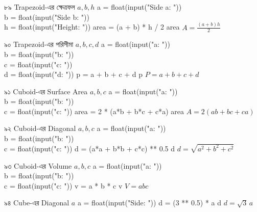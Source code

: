 
\formulaexercise
{৮৯}
{Trapezoid-এর ক্ষেত্রফল}
{\(a,b,h\)}
{a = float(input("Side a: "))\\
b = float(input("Side b: "))\\
h = float(input("Height: "))}
{area = (a + b) * h / 2}
{area}
{\(A=\frac{(a+b)h}{2}\)}


\formulaexercise
{৯০}
{Trapezoid-এর পরিসীমা}
{\(a,b,c,d\)}
{a = float(input("a: "))\\
b = float(input("b: "))\\
c = float(input("c: "))\\
d = float(input("d: "))}
{p = a + b + c + d}
{p}
{\(P=a+b+c+d\)}


\formulaexercise
{৯১}
{Cuboid-এর Surface Area}
{\(a,b,c\)}
{a = float(input("a: "))\\
b = float(input("b: "))\\
c = float(input("c: "))}
{area = 2 * (a*b + b*c + c*a)}
{area}
{\(A=2(ab+bc+ca)\)}


\formulaexercise
{৯২}
{Cuboid-এর Diagonal}
{\(a,b,c\)}
{a = float(input("a: "))\\
b = float(input("b: "))\\
c = float(input("c: "))}
{d = (a*a + b*b + c*c) ** 0.5}
{d}
{\(d=\sqrt{a^2+b^2+c^2}\)}


\formulaexercise
{৯৩}
{Cuboid-এর Volume}
{\(a,b,c\)}
{a = float(input("a: "))\\
b = float(input("b: "))\\
c = float(input("c: "))}
{v = a * b * c}
{v}
{\(V=abc\)}


\formulaexercise
{৯৪}
{Cube-এর Diagonal}
{\(a\)}
{a = float(input("Side: "))}
{d = (3 ** 0.5) * a}
{d}
{\(d=\sqrt3\,a\)}

